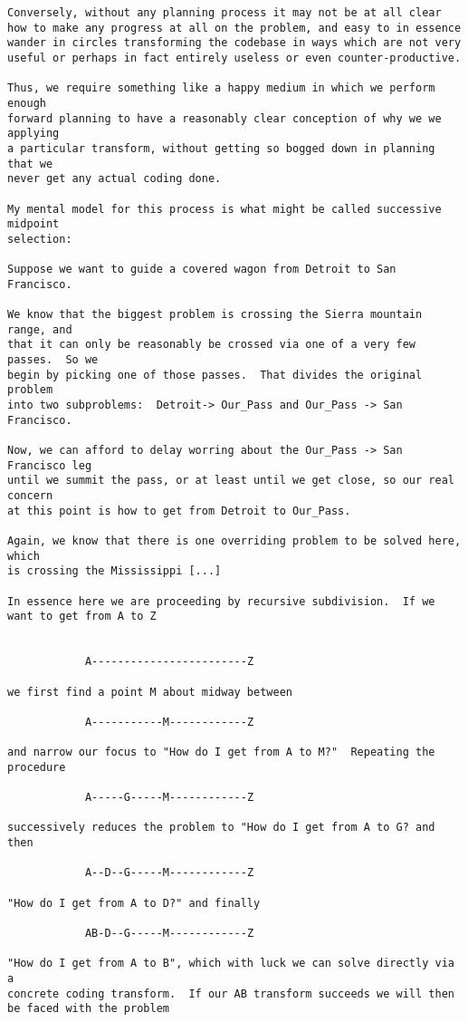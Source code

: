 \begin{verbatim}
Conversely, without any planning process it may not be at all clear
how to make any progress at all on the problem, and easy to in essence
wander in circles transforming the codebase in ways which are not very
useful or perhaps in fact entirely useless or even counter-productive.

Thus, we require something like a happy medium in which we perform enough
forward planning to have a reasonably clear conception of why we we applying
a particular transform, without getting so bogged down in planning that we
never get any actual coding done.

My mental model for this process is what might be called successive midpoint
selection:

Suppose we want to guide a covered wagon from Detroit to San Francisco.

We know that the biggest problem is crossing the Sierra mountain range, and
that it can only be reasonably be crossed via one of a very few passes.  So we
begin by picking one of those passes.  That divides the original problem
into two subproblems:  Detroit-> Our_Pass and Our_Pass -> San Francisco.

Now, we can afford to delay worring about the Our_Pass -> San Francisco leg
until we summit the pass, or at least until we get close, so our real concern
at this point is how to get from Detroit to Our_Pass.

Again, we know that there is one overriding problem to be solved here, which
is crossing the Mississippi [...]

In essence here we are proceeding by recursive subdivision.  If we want to get from A to Z


            A------------------------Z

we first find a point M about midway between

            A-----------M------------Z

and narrow our focus to "How do I get from A to M?"  Repeating the procedure

            A-----G-----M------------Z

successively reduces the problem to "How do I get from A to G? and then

            A--D--G-----M------------Z

"How do I get from A to D?" and finally

            AB-D--G-----M------------Z

"How do I get from A to B", which with luck we can solve directly via a
concrete coding transform.  If our AB transform succeeds we will then
be faced with the problem


\end{verbatim}
